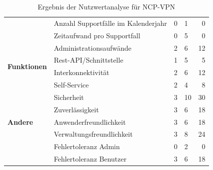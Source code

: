 \begin{table}
\begin{tabular}{l|l|l|l|r|}
		~                                      & Anzahl Supportfälle im Kalenderjahr & 0                   & 1                  & 0                 \\
		~                                      & Zeitaufwand pro Supportfall         & 0                   & 5                  & 0                 \\
		~                                      & Administrationsaufwände             & 2                   & 6                  & 12                \\
		\cline{2-5}
		\multirow{2}{6em}{\textbf{Funktionen}} & Rest-API/Schnittstelle              & 1                   & 5                  & 5                 \\
		~                                      & Interkonnektivität                  & 2                   & 6                  & 12                \\
		\cline{2-5}
		\multirow{7}{6em}{\textbf{Andere}}     & Self-Service                        & 2                   & 4                  & 8                 \\
		~                                      & Sicherheit                          & 3                   & 10                 & 30                \\
		~                                      & Zuverlässigkeit                     & 3                   & 6                  & 18                \\
		~                                      & Anwenderfreundlichkeit              & 3                   & 6                  & 18                \\
		~                                      & Verwaltungsfreundlichkeit           & 3                   & 8                  & 24                \\
		~                                      & Fehlertoleranz Admin                & 0                   & 2                  & 0                 \\
		~                                      & Fehlertoleranz Benutzer             & 3                   & 6                  & 18                \\
		\cline{2-5}
	\end{tabular}
	\caption[Ergebnis der Nutzwertanalyse für NCP-VPN]{Ergebnis der Nutzwertanalyse für NCP-VPN}
	\label{tab:ErgebnisNCP}
\end{table}

